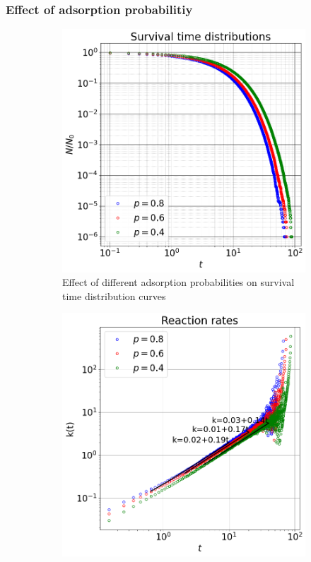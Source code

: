 \documentclass{article}
\begin{document}
\subsubsection{Effect of adsorption probabilitiy}
\begin{figure}[htbp]
    \centering
    \begin{subfigure}[b]{0.48\textwidth}
        \centering
        \includegraphics[width=\textwidth]{images/survTimeDistCompareAdsProb.png}
        \caption{Effect of different adsorption probabilities on survival time distribution curves}
    \end{subfigure}
    \hfill
    \begin{subfigure}[b]{0.48\textwidth}
        \centering
        \includegraphics[width=\textwidth]{images/ratesCompareProb.png}

\end{subfigure}
\end{figure}
\end{document}
